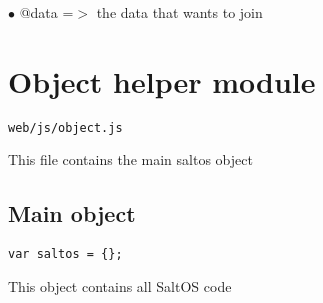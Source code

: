 \documentclass[a4paper]{book}
\begin{document}
\begin{compactitem}
\item[\color{myblue}$\bullet$] @data =$>$ the data that wants to join
\end{compactitem}

\hypertarget{toc527}{}
\section{Object helper module}

\begin{lstlisting}
web/js/object.js
\end{lstlisting}

This file contains the main saltos object

\hypertarget{toc528}{}
\subsection{Main object}

\begin{lstlisting}
var saltos = {};
\end{lstlisting}

This object contains all SaltOS code

\end{document}
